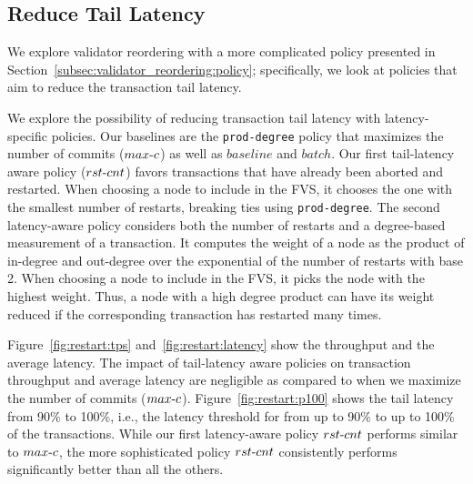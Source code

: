 
\subsection{Reduce Tail Latency}
We explore validator reordering with a more complicated policy presented in Section~\ref{subsec:validator_reordering:policy}; specifically, we look at policies that aim to reduce the transaction tail latency.

We explore the possibility of reducing transaction tail latency with latency-specific policies. Our baselines are the \texttt{prod-degree} policy that maximizes the number of commits ($max\hbox{-}c$) as well as $baseline$ and $batch$. 
Our first tail-latency aware policy ($rst\hbox{-}cnt$) favors transactions that have already been aborted and restarted. When choosing a node to include in the FVS, it chooses the one with the smallest number of restarts, breaking ties using \texttt{prod-degree}.
The second latency-aware policy considers both the number of restarts and a
degree-based measurement of a transaction. It computes the weight of a node as
the product of in-degree and out-degree over the exponential of the number of
restarts with base 2. When choosing a node to include in the FVS, it picks the node with the highest weight. Thus, a node with a high degree product can have its weight reduced if the corresponding transaction has restarted many times.

Figure~\ref{fig:restart:tps} and~\ref{fig:restart:latency} show the throughput
and the average latency. The impact of tail-latency aware policies on transaction throughput and average latency are negligible as compared to when we maximize the number of commits ($max\hbox{-}c$).
Figure~\ref{fig:restart:p100} shows the tail latency from 90\% to 100\%, i.e., the latency threshold for from up to 90\% to up to 100\% of the transactions. %
While our first latency-aware policy $rst\hbox{-}cnt$ performs similar to $max\hbox{-}c$, the more sophisticated policy $rst\hbox{-}cnt$ consistently performs significantly better than all the others.

